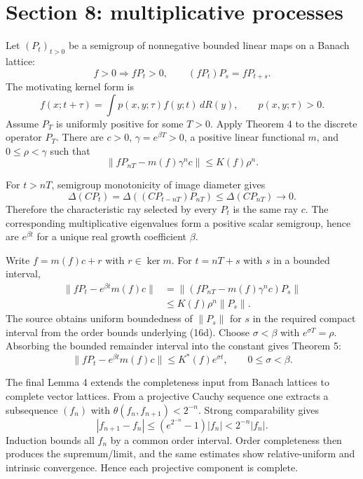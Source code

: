 \documentclass[11pt]{article}
\begin{document}
\section{Section 8: multiplicative processes}
Let $(P_t)_{t>0}$ be a semigroup of nonnegative bounded linear maps on a Banach lattice:
\begin{equation}
 f>0\Longrightarrow fP_t>0,
 \qquad
 (fP_t)P_s=fP_{t+s}. \tag{18}
\end{equation}
The motivating kernel form is
\begin{equation}
 f(x;t+\tau)=\int p(x,y;\tau)f(y;t)\,dR(y),
 \qquad p(x,y;\tau)>0. \tag{19}
\end{equation}
Assume $P_T$ is uniformly positive for some $T>0$.  Apply Theorem 4 to the discrete operator
$P_T$.  There are $c>0$, $\gamma=e^{\beta T}>0$, a positive linear functional $m$, and
$0\le\rho<\gamma$ such that
\[
 \|fP_{nT}-m(f)\gamma^n c\|\le K(f)\rho^n.
\]

For $t>nT$, semigroup monotonicity of image diameter gives
\begin{equation}
 \Delta(CP_t)
 =\Delta((CP_{t-nT})P_{nT})
 \le\Delta(CP_{nT})\longrightarrow0. \tag{21}
\end{equation}
Therefore the characteristic ray selected by every $P_t$ is the same ray $c$.  The corresponding
multiplicative eigenvalues form a positive scalar semigroup, hence are $e^{\beta t}$ for a unique
real growth coefficient $\beta$.

Write $f=m(f)c+r$ with $r\in\ker m$.  For $t=nT+s$ with $s$ in a bounded interval,
\begin{align*}
 \|fP_t-e^{\beta t}m(f)c\|
 &=\|(fP_{nT}-m(f)\gamma^nc)P_s\|\\
 &\le K(f)\rho^n\|P_s\|.
\end{align*}
The source obtains uniform boundedness of $\|P_s\|$ for $s$ in the required compact interval from
the order bounds underlying (16d).  Choose $\sigma<\beta$ with $e^{\sigma T}=\rho$.  Absorbing the
bounded remainder interval into the constant gives Theorem 5:
\begin{equation}
 \|fP_t-e^{\beta t}m(f)c\|
 \le K^*(f)e^{\sigma t},
 \qquad 0\le\sigma<\beta. \tag{20,22}
\end{equation}

The final Lemma 4 extends the completeness input from Banach lattices to complete vector lattices.
From a projective Cauchy sequence one extracts a subsequence $(f_n)$ with
$\theta(f_n,f_{n+1})<2^{-n}$.  Strong comparability gives
\[
 |f_{n+1}-f_n|
 \le(e^{2^{-n}}-1)|f_n|<2^{-n}|f_n|.
\]
Induction bounds all $f_n$ by a common order interval.  Order completeness then produces the
supremum/limit, and the same estimates show relative-uniform and intrinsic convergence.  Hence
each projective component is complete.
\end{document}
